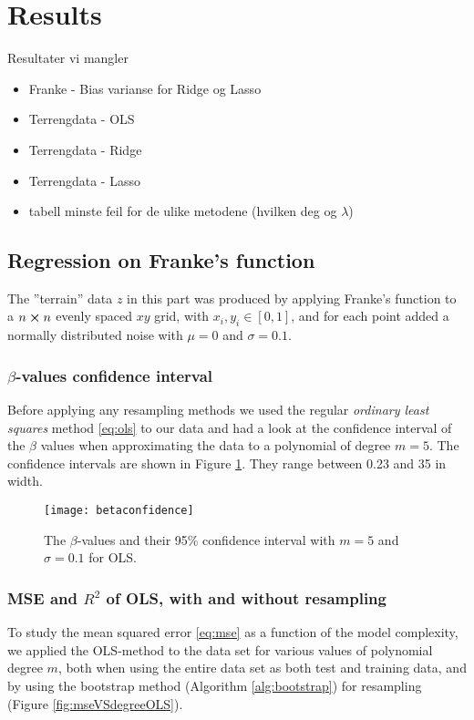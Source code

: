 \section{Results}
\label{sec:results}
Resultater vi mangler
\begin{itemize}
\item Franke - Bias varianse for Ridge og Lasso
\item Terrengdata - OLS
\item Terrengdata - Ridge
\item Terrengdata - Lasso
\item tabell minste feil for de ulike metodene (hvilken deg og $\lambda$)
\end{itemize}
\subsection{Regression on Franke's function}
The {''}terrain'' data $z$ in this part was produced by applying Franke's function to a $n\cross n$ evenly spaced $xy$ grid, with $x_i,y_i\in [0,1]$, and for each point added a normally distributed noise with $\mu = 0$ and $\sigma = 0.1$.
\subsubsection{$\beta$-values confidence interval}
Before applying any resampling methods we used the regular \emph{ordinary least squares} method \eqref{eq:ols} to our data and had a look at the confidence interval of the $\beta$ values when approximating the data to a polynomial of degree $m=5$. The confidence intervals are shown in Figure \ref{fig:betaconfidence}.
They range between 0.23 and 35 in width.
\begin{figure}[htbp]
	\centering
	\texttt{[image: betaconfidence]}
	\caption{The $\beta$-values and their 95\% confidence interval with $m=5$ and $\sigma=0.1$ for OLS.}
	\label{fig:betaconfidence}
\end{figure}

\subsubsection{MSE and $R^2$ of OLS, with and without resampling}
To study the mean squared error \eqref{eq:mse} as a function of the model complexity, we applied the OLS-method to the data set for various values of polynomial degree $m$, both when using the entire data set as both test and training data, and by using the bootstrap method (Algorithm \ref{alg:bootstrap}) for resampling (Figure \ref{fig:mseVSdegreeOLS}).

